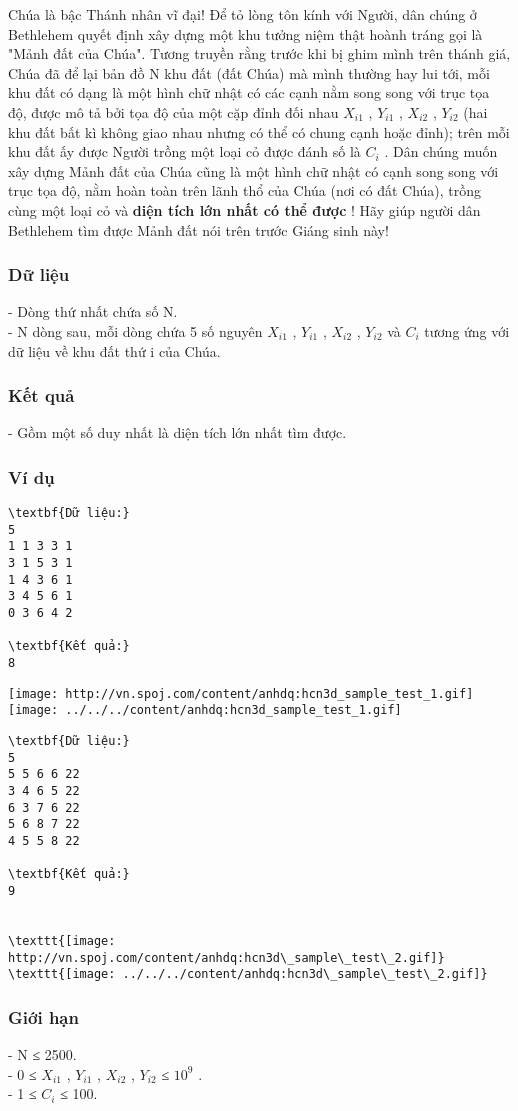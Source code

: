 

Chúa là bậc Thánh nhân vĩ đại! Để tỏ lòng tôn kính với Người, dân chúng ở Bethlehem quyết định xây dựng một khu tưởng niệm thật hoành tráng gọi là "Mảnh đất của Chúa". Tương truyền rằng trước khi bị ghim mình trên thánh giá, Chúa đã để lại bản đồ N khu đất (đất Chúa) mà mình thường hay lui tới, mỗi khu đất có dạng là một hình chữ nhật có các cạnh nằm song song với trục tọa độ, được mô tả bởi tọa độ của một cặp đỉnh đối nhau $X_{i1}$ , $Y_{i1}$ , $X_{i2}$ , $Y_{i2}$ (hai khu đất bất kì không giao nhau nhưng có thể có chung cạnh hoặc đỉnh); trên mỗi khu đất ấy được Người trồng một loại cỏ được đánh số là $C_{i}$ . Dân chúng muốn xây dựng Mảnh đất của Chúa cũng là một hình chữ nhật có cạnh song song với trục tọa độ, nằm hoàn toàn trên lãnh thổ của Chúa (nơi có đất Chúa), trồng cùng một loại cỏ và \textbf{ diện tích lớn nhất có thể được } ! Hãy giúp người dân Bethlehem tìm được Mảnh đất nói trên trước Giáng sinh này!

\subsubsection{Dữ liệu}

- Dòng thứ nhất chứa số N.
\\- N dòng sau, mỗi dòng chứa 5 số nguyên $X_{i1}$ , $Y_{i1}$ , $X_{i2}$ , $Y_{i2}$ và $C_{i}$ tương ứng với dữ liệu về khu đất thứ i của Chúa.

\subsubsection{Kết quả}

- Gồm một số duy nhất là diện tích lớn nhất tìm được.

\subsubsection{Ví dụ}
\begin{verbatim}
\textbf{Dữ liệu:}
5
1 1 3 3 1
3 1 5 3 1
1 4 3 6 1
3 4 5 6 1
0 3 6 4 2

\textbf{Kết quả:}
8
\end{verbatim}


\texttt{[image: http://vn.spoj.com/content/anhdq:hcn3d\_sample\_test\_1.gif]}
\texttt{[image: ../../../content/anhdq:hcn3d\_sample\_test\_1.gif]}
\begin{verbatim}
\textbf{Dữ liệu:}
5
5 5 6 6 22
3 4 6 5 22
6 3 7 6 22
5 6 8 7 22
4 5 5 8 22

\textbf{Kết quả:}
9


\texttt{[image: http://vn.spoj.com/content/anhdq:hcn3d\_sample\_test\_2.gif]}
\texttt{[image: ../../../content/anhdq:hcn3d\_sample\_test\_2.gif]}\end{verbatim}

\subsubsection{Giới hạn}

- N ≤ 2500.
\\- 0 ≤ $X_{i1}$ , $Y_{i1}$ , $X_{i2}$ , $Y_{i2}$ ≤ $10^{9}$ .
\\- 1 ≤ $C_{i}$ ≤ 100.

 
